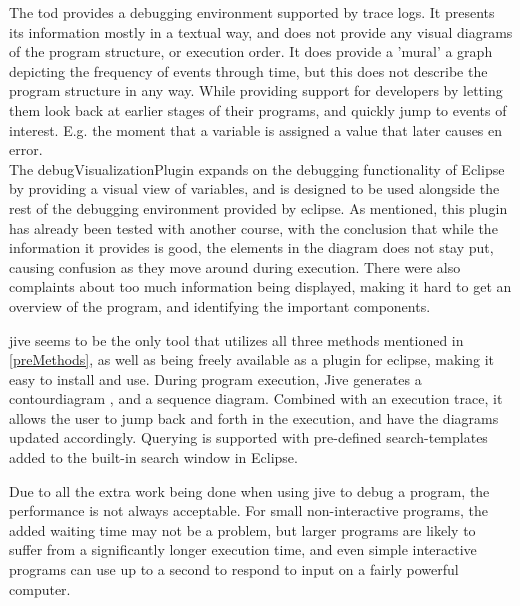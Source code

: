 The \gls{tod} provides a debugging environment supported by trace logs.
It presents its information mostly in a textual way, and does not provide any visual diagrams of the program structure, or execution order.
It does provide a 'mural' a graph depicting the frequency of events through time, but this does not describe the program structure in any way.
While providing support for developers by letting them look back at earlier stages of their programs, and quickly jump to events of interest.
E.g. the moment that a variable is assigned a value that later causes en error.
~\\

The \gls{debugVisualizationPlugin} expands on the debugging functionality of Eclipse by providing a visual view of variables, and is designed to be used alongside the rest of the debugging environment provided by eclipse.
As mentioned, this plugin has already been tested with another course, with the conclusion that while the information it provides is good, the elements in the diagram does not stay put, causing confusion as they move around during execution.
There were also complaints about too much information being displayed, making it hard to get an overview of the program, and identifying the important components.%
~\\

\begin{sloppypar}
\Gls{jive} seems to be the only tool that utilizes all three methods mentioned in \autoref{preMethods}, as well as being freely available as a plugin for eclipse, making it easy to install and use.
During program execution, Jive generates a \gls{contourdiagram} \cite{Jayaraman1996}, and a sequence diagram.
Combined with an execution trace, it allows the user to jump back and forth in the execution, and have the diagrams updated accordingly.
Querying is supported with pre-defined search-templates added to the built-in search window in Eclipse.
~\\
\end{sloppypar}

Due to all the extra work being done when using jive to debug a program, the performance is not always acceptable.
For small non-interactive programs, the added waiting time may not be a problem, but larger programs are likely to suffer from a significantly longer execution time, and even simple interactive programs can use up to a second to respond to input on a fairly powerful computer.
~\\





